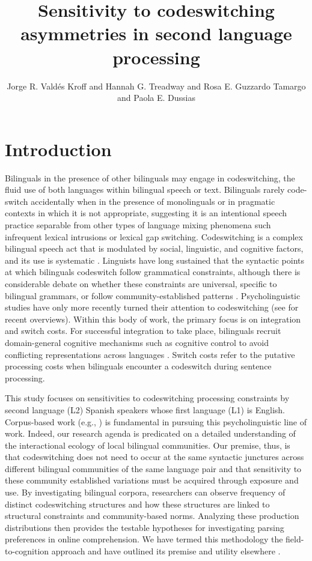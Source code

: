 \documentclass[output=paper,colorlinks,citecolor=brown]{langscibook}
\author{Jorge R. Vald\'es Kroff\orcid{0000-0002-3943-5496}\affiliation{University of Florida} and         Hannah G. Treadway\orcid{0000-0001-6244-7674}\affiliation{University of Florida} and         Rosa E. Guzzardo Tamargo\orcid{0000-0002-3074-8680}\affiliation{University of Puerto Rico at R\'io Piedras} and Paola E. Dussias\orcid{0000-0002-9481-7489}\affiliation{Pennsylvania State University}}
\title{Sensitivity to codeswitching asymmetries in second language processing}
\begin{document}
\maketitle

\section{Introduction}
Bilinguals in the presence of other bilinguals may engage in codeswitching, the fluid use of both languages within bilingual speech or text. Bilinguals rarely code-switch accidentally when in the presence of monolinguals or in pragmatic contexts in which it is not appropriate, suggesting it is an intentional speech practice separable from other types of language mixing phenomena such infrequent lexical intrusions \citep{Gollan2016} or lexical gap switching. Codeswitching is a complex bilingual speech act that is modulated by social, linguistic, and cognitive factors, and its use is systematic \citep{Deuchar2020,TorresCacoullosTravis2018}. Linguists have long sustained that the syntactic points at which bilinguals codeswitch follow grammatical constraints, although there is considerable debate on whether these constraints are universal, specific to bilingual grammars, or follow community-established patterns \citep{Deuchar2020,Licerasetal2008,Lopez2020,ParafitaCoutoGullberg2017,ParafitaCoutoetal2023}. Psycholinguistic studies have only more recently turned their attention to codeswitching (see \cite{ValdesKroffetal2023,VanHell2022} for recent overviews). Within this body of work, the primary focus is on integration and switch costs. For successful integration to take place, bilinguals recruit domain-general cognitive mechanisms such as cognitive control to avoid conflicting representations across languages \citep{ValdesKroffDussias2023}. Switch costs refer to the putative processing costs when bilinguals encounter a codeswitch during sentence processing.

This study focuses on sensitivities to codeswitching processing constraints by second language (L2) Spanish speakers whose first language (L1) is English. Corpus-based work (e.g., \cite{Deucharetal2014}) is fundamental in pursuing this psycholinguistic line of work. Indeed, our research agenda is predicated on a detailed understanding of the interactional ecology of local bilingual communities. Our premise, thus, is that codeswitching does not need to occur at the same syntactic junctures across different bilingual communities of the same language pair and that sensitivity to these community established variations must be acquired through exposure and use. By investigating bilingual corpora, researchers can observe frequency of distinct codeswitching structures and how these structures are linked to structural constraints and community-based norms. Analyzing these production distributions then provides the testable hypotheses for investigating parsing preferences in online comprehension. We have termed this methodology the field-to-cognition approach and have outlined its premise and utility elsewhere \citep{BeattyMartinezetal2018,ValdesKroffetal2018}.
\end{document}
